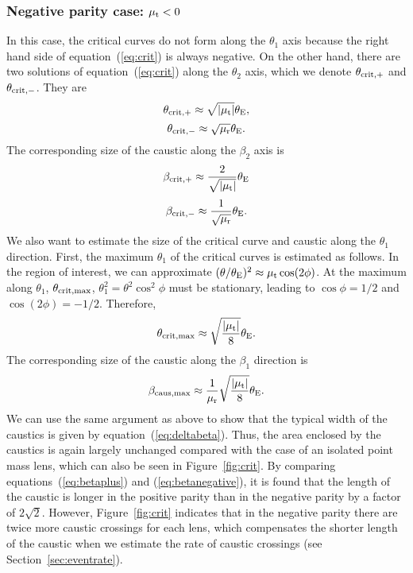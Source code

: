 \documentclass[showpacs,twocolumn,preprintnumbers,amsmath,amssymb,superscriptaddress,nofootinbib]{revtex4}
\newcommand{\morv}[1]{#1}
\begin{document}
\subsubsection{Negative parity case: $\mu_{\rm t}<0$}

In this case, the critical curves do not form along the $\theta_1$ axis
because the right hand side of equation~(\ref{eq:crit}) is always
negative. On the other hand, there are two solutions of
equation~(\ref{eq:crit}) along the $\theta_2$ axis, which we denote
$\theta_{\rm crit,+}$ and  $\theta_{\rm crit,-}$. They are
\begin{equation}
\theta_{\rm crit,+}\approx \sqrt{|\mu_{\rm t}|}\theta_{\rm E},
\end{equation}
\begin{equation}
\theta_{\rm crit,-}\approx \sqrt{\mu_{\rm r}}\theta_{\rm E}.
\end{equation}
The corresponding size of the caustic along the $\beta_2$ axis is
\begin{equation}
\beta_{\rm crit,+}\approx \frac{2}{\sqrt{|\mu_{\rm t}|}}\theta_{\rm E}
\end{equation}
\begin{equation}
\beta_{\rm crit,-}\approx \frac{1}{\sqrt{\mu_{\rm r}}}\theta_{\rm E}.
\end{equation}
We also want to estimate the size of the critical curve and caustic
along the $\theta_1$ direction. First, the maximum $\theta_1$ of the
critical curves is estimated as follows. In the region of interest, we
can approximate $(\theta/\theta_{\rm E})^2\approx \mu_{\rm
  t}\cos(2\phi)$. At the maximum along $\theta_1$,
$\theta_{\rm crit,max}$, $\theta_1^2=\theta^2\cos^2\phi$ must be
stationary, leading to $\cos\phi=1/2$ and $\cos(2\phi)=-1/2$.
Therefore,
\begin{equation}
 \theta_{\rm crit,max}\approx\sqrt{\frac{|\mu_{\rm t}|}{8}}\theta_{\rm E}.
\end{equation}
The corresponding size of the caustic along the $\beta_1$ direction is
\begin{equation}
  \beta_{\rm caus,max}\approx\frac{1}{\mu_{\rm r}}
  \sqrt{\frac{|\mu_{\rm t}|}{8}}\theta_{\rm E}.
\label{eq:betanegative}
\end{equation}
We can use the same argument as above to show that the typical width
of the caustics is given by equation~(\ref{eq:deltabeta}). Thus, the
area enclosed by the caustics is again largely unchanged compared with
the case of an isolated point mass lens, which can also be seen in
Figure~\ref{fig:crit}. By comparing equations~(\ref{eq:betaplus}) and
(\ref{eq:betanegative}), it is found that 
\morv{the length of the caustic is longer in the positive parity than
  in the negative parity by a factor of $2\sqrt{2}$. However,
  Figure~\ref{fig:crit} indicates that in the negative parity there
  are twice more caustic crossings for each lens, which compensates
  the shorter length of the caustic when we estimate the rate of
  caustic crossings (see Section~\ref{sec:eventrate}). }
\end{document}
